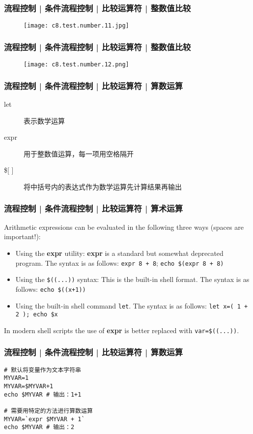 \begin{frame}
  \frametitle{流程控制 | 条件流程控制 | 比较运算符 | 整数值比较}
  \begin{figure}
    \centering
    \texttt{[image: c8.test.number.11.jpg]}
  \end{figure}
\end{frame}

\begin{frame}
  \frametitle{流程控制 | 条件流程控制 | 比较运算符 | 整数值比较}
  \begin{figure}
    \centering
    \texttt{[image: c8.test.number.12.png]}
  \end{figure}
\end{frame}

\begin{frame}[fragile]
  \frametitle{流程控制 | 条件流程控制 | 比较运算符 | \alert{算数运算}}
  \begin{description}
    \item[let] 表示数学运算
    \item[expr] 用于整数值运算，每一项用空格隔开
    \item[\${[} {]}] 将中括号内的表达式作为数学运算先计算结果再输出
  \end{description}
\end{frame}

\begin{frame}[fragile]
  \frametitle{流程控制 | 条件流程控制 | 比较运算符 | 算术运算}
  Arithmetic expressions can be evaluated in the following three ways (spaces are important!):
  \begin{itemize}
    \item Using the \textbf{expr} utility: \textbf{expr} is a standard but somewhat deprecated program. The syntax is as follows: \verb|expr 8 + 8|; \verb|echo $(expr 8 + 8)|
    \item Using the \verb|$((...))| syntax: This is the built-in shell format. The syntax is as follows: \verb|echo $((x+1))|
    \item Using the built-in shell command \verb|let|.  The syntax is as follows: \verb|let x=( 1 + 2 ); echo $x|
  \end{itemize}
  In modern shell scripts the use of \textbf{expr} is better replaced with \verb|var=$((...))|.
\end{frame}

\begin{frame}[fragile]
  \frametitle{流程控制 | 条件流程控制 | 比较运算符 | 算数运算}
\begin{lstlisting}
# 默认将变量作为文本字符串
MYVAR=1
MYVAR=$MYVAR+1
echo $MYVAR # 输出：1+1

# 需要用特定的方法进行算数运算
MYVAR=`expr $MYVAR + 1`
echo $MYVAR # 输出：2
\end{lstlisting}
\end{frame}

